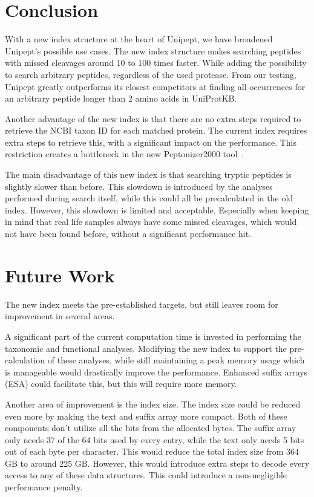 \documentclass[11pt]{article}
\begin{document}
\begin{multicols}{2}
        \section{Conclusion}\label{sec:discussion}
        With a new index structure at the heart of Unipept, we have broadened Unipept's possible use cases.
        The new index structure makes searching peptides with missed cleavages around 10 to 100 times faster.
        While adding the possibility to search arbitrary peptides, regardless of the used protease.
        From our testing, Unipept greatly outperforms its closest competitors at finding all occurrences for an arbitrary peptide longer than 2 amino acids in UniProtKB\@.

        Another advantage of the new index is that there are no extra steps required to retrieve the NCBI taxon ID for each matched protein.
        The current index requires extra steps to retrieve this, with a significant impact on the performance.
        This restriction creates a bottleneck in the new Peptonizer2000 tool~\cite{pep_gm}.

        The main disadvantage of this new index is that searching tryptic peptides is slightly slower than before.
        This slowdown is introduced by the analyses performed during search itself, while this could all be precalculated in the old index.
        However, this slowdown is limited and acceptable.
        Especially when keeping in mind that real life samples always have some missed cleavages, which would not have been found before, without a significant performance hit.


        \section{Future Work}
        The new index meets the pre-established targets, but still leaves room for improvement in several areas.

        A significant part of the current computation time is invested in performing the taxonomic and functional analyses.
        Modifying the new index to support the pre-calculation of these analyses, while still maintaining a peak memory usage which is manageable would drastically improve the performance.
        Enhanced suffix arrays (ESA) could facilitate this, but this will require more memory.

        Another area of improvement is the index size.
        The index size could be reduced even more by making the text and suffix array more compact.
        Both of these components don't utilize all the bits from the allocated bytes.
        The suffix array only needs 37 of the 64 bits used by every entry, while the text only needs 5 bits out of each byte per character.
        This would reduce the total index size from 364 GB to around 225 GB\@.
        However, this would introduce extra steps to decode every access to any of these data structures.
        This could introduce a non-negligible performance penalty.


\end{multicols}
\end{document}
